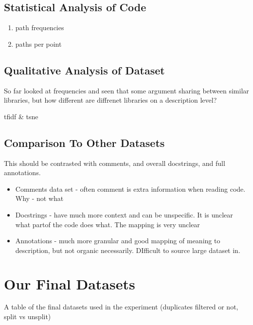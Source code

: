 \subsection{Statistical Analysis of Code} %
\label{sub:statistical_analysis_of_code}

\begin{enumerate}
    \item path frequencies
    \item paths per point
\end{enumerate}


\subsection{Qualitative Analysis of Dataset} %
\label{sub:qualitative_analysis_}
So far looked at frequencies and seen that some argument sharing between similar libraries, but how different are diffrenet libraries on a description level?

tfidf \& tsne



\subsection{Comparison To Other Datasets} %
\label{sub:comparison_to_other_datasets}

    This should be contrasted with comments, and overall docstrings, and full annotations.
    \begin{itemize}
        \item Comments data set - often comment is extra information when reading code. Why - not what
        \item Docstrings - have much more context and can be unspecific. It is unclear what partof the code does what. The mapping is very unclear
        \item Annotations - much more granular and good mapping of meaning to description, but not organic necessarily. DIfficult to source large dataset in.
    \end{itemize}


\section{Our Final Datasets} %
\label{sec:our_final_datasets}

A table of the final datasets used in the experiment (duplicates filtered or not, split vs unsplit)


